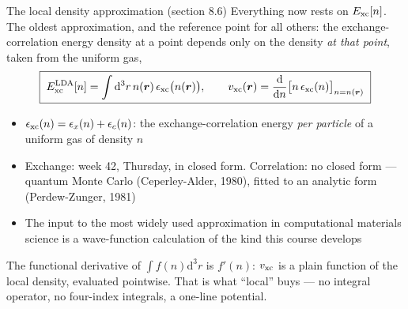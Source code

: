 \documentclass[aspectratio=169,10pt]{beamer}
\newcommand{\mbbox}[1]{%
  \begin{tcolorbox}[colback=paleblue,colframe=uioblue,title={\bfseries Many-body connection}]
  #1
  \end{tcolorbox}}
\newcommand{\dd}{\mathrm{d}}
\begin{document}
\begin{frame}[shrink=6]{The local density approximation (section 8.6)}
  Everything now rests on $E_{\rm xc}[n]$. The oldest approximation, and the reference point for all others: the exchange-correlation energy density at a point depends only on the density \emph{at that point}, taken from the uniform gas,
  \[
    \boxed{\;E_{\rm xc}^{\rm LDA}[n]=\int\dd^3r\,n(\bm r)\,\epsilon_{\rm xc}\bigl(n(\bm r)\bigr),\qquad
    v_{\rm xc}(\bm r)=\frac{\dd}{\dd n}\bigl[n\,\epsilon_{\rm xc}(n)\bigr]_{n=n(\bm r)}\;}
  \]
  \begin{itemize}
    \item $\epsilon_{\rm xc}(n)=\epsilon_x(n)+\epsilon_c(n)$: the exchange-correlation energy \emph{per particle} of a uniform gas of density $n$
    \item Exchange: week 42, Thursday, in closed form. Correlation: no closed form --- quantum Monte Carlo (Ceperley-Alder, 1980), fitted to an analytic form (Perdew-Zunger, 1981)
    \item The input to the most widely used approximation in computational materials science is a \alert{wave-function calculation} of the kind this course develops
  \end{itemize}
  \mbbox{The functional derivative of $\int f(n)\dd^3r$ is $f'(n)$: $v_{\rm xc}$ is a plain function of the local density, evaluated pointwise. That is what ``local'' buys --- no integral operator, no four-index integrals, a one-line potential.}
\end{frame}
\end{document}
